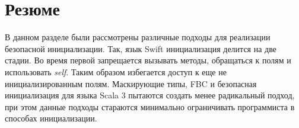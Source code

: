 \section{Резюме}\label{sec:обзор-резюме}

В данном разделе были рассмотрены различные подходы для реализации безопасной инициализации.
Так, язык Swift инициализация делится на две стадии.
Во время первой запрещается вызывать методы, обращаться к полям и использовать \emph{self}.
Таким образом избегается доступ к еще не инициализированным полям.
Маскирующие типы, FBC и безопасная инициализация для языка Scala 3 пытаются создать менее радикальный подход,
при этом данные подходы стараются минимально ограничивать программиста в способах инициализации.


